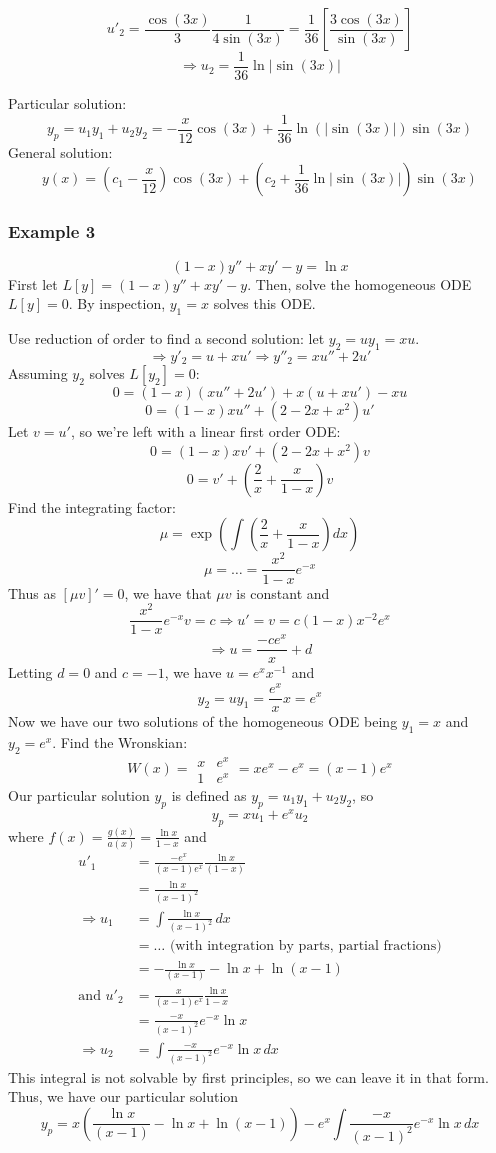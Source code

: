 \documentclass[11pt]{article}
\begin{document}
		$$ u'_2 = \frac{\cos(3x)}{3} \frac{1}{4 \sin (3x)} = \frac{1}{36} \left[ \frac{3 \cos(3x)}{\sin(3x)}\right] $$
		$$ \Rightarrow u_2 = \frac{1}{36} \ln |\sin(3x)| $$

	Particular solution:
		$$ y_p = u_1 y_1 + u_2 y_2 = - \frac{x}{12} \cos(3x) + \frac{1}{36} \ln(|\sin(3x)|) \sin(3x) $$
	General solution:
		$$ y(x) = \left(c_1 - \frac{x}{12}\right) \cos(3x) + \left(c_2 + \frac{1}{36} \ln |\sin (3x)| \right) \sin(3x) $$

\subsubsection{Example 3}
		$$ (1-x)y'' + xy' - y = \ln x $$
	First let $L[y] = (1-x)y'' + xy' - y$. Then, solve the homogeneous ODE $L[y] = 0$. By inspection, $y_1 = x$ solves this ODE.

	Use reduction of order to find a second solution: let $y_2 = u y_1 = xu$.
		$$ \Rightarrow y'_2 = u + xu' \Rightarrow y''_2 = xu'' + 2u' $$
	Assuming $y_2$ solves $L[y_2] = 0$:
		$$ 0 = (1-x)(xu'' + 2u') + x(u + xu') - xu $$
		$$ 0 = (1-x)xu'' + (2 - 2x + x^2)u' $$
	Let $v = u'$, so we're left with a linear first order ODE:
		$$ 0 = (1-x)x v' + (2-2x + x^2)v $$
		$$ 0 = v' + \left(\frac{2}{x} + \frac{x}{1-x}\right) v $$
	Find the integrating factor:
		$$ \mu = \exp \left( \int \left(\frac{2}{x} + \frac{x}{1-x}\right) dx \right) $$
		$$ \mu = \ldots = \frac{x^2}{1-x} e^{-x} $$
	Thus as $[\mu v]' = 0$, we have that $\mu v$ is constant and
		$$ \frac{x^2}{1-x} e^{-x} v = c \Rightarrow u' = v = c(1-x)x^{-2} e^x $$
		$$ \Rightarrow u = \frac{-c e^x}{x} + d $$
	Letting $d = 0$ and $c = -1$, we have $u = e^x x^{-1}$ and
		$$ y_2 = u y_1 = \frac{e^x}{x} x = e^x $$
	Now we have our two solutions of the homogeneous ODE being $y_1 = x$ and $y_2 = e^x$. Find the Wronskian:
		$$ W(x) =
			\begin{array}{|cc|}
				x & e^x \\
				1 & e^x
			\end{array}
			= x e^x - e^x = (x-1)e^x
		$$
	Our particular solution $y_p$ is defined as $y_p = u_1 y_1 + u_2 y_2$, so
		$$ y_p = x u_1 + e^x u_2 $$
	where $f(x) = \frac{g(x)}{a(x)} = \frac{\ln x}{1-x}$ and
		\begin{align*}
			u'_1 &= \frac{-e^x}{(x-1)e^x} \frac{\ln x}{(1-x)} \\
				&= \frac{\ln x}{(x-1)^2} \\
			\Rightarrow u_1 &= \int \frac{\ln x}{(x-1)^2} \,dx \\
				&= \ldots \text{ (with integration by parts, partial fractions)} \\
				&= - \frac{\ln x}{(x-1)} - \ln x + \ln (x-1) \\
			\text{and } u'_2 &= \frac{x}{(x-1)e^x} \frac{\ln x}{1-x} \\
				&= \frac{-x}{(x-1)^2} e^{-x} \ln x \\
			\Rightarrow u_2 &= \int \frac{-x}{(x-1)^2} e^{-x} \ln x \,dx
		\end{align*}
	This integral is not solvable by first principles, so we can leave it in that form. Thus, we have our particular solution
		$$ y_p = x \left(\frac{\ln x}{(x-1)} - \ln x + \ln (x-1) \right) - e^x \int \frac{-x}{(x-1)^2} e^{-x} \ln x \,dx $$
\end{document}
